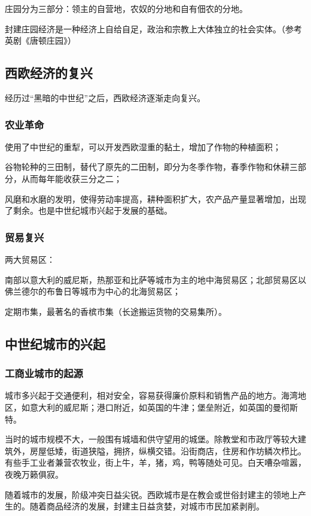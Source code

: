 庄园分为三部分：领主的自营地，农奴的分地和自有佃农的分地。

封建庄园经济是一种经济上自给自足，政治和宗教上大体独立的社会实体。（参考英剧《唐顿庄园》）

\subsection{西欧经济的复兴}
经历过“黑暗的中世纪”之后，西欧经济逐渐走向复兴。

\subsubsection{农业革命}
使用了中世纪的重犁，可以开发西欧湿重的黏土，增加了作物的种植面积；

谷物轮种的三田制，替代了原先的二田制，即分为冬季作物，春季作物和休耕三部分，从而每年能收获三分之二；

风磨和水磨的发明，使得劳动率提高，耕种面积扩大，农产品产量显著增加，出现了剩余。也是中世纪城市兴起于发展的基础。

\subsubsection{贸易复兴}
两大贸易区：

南部以意大利的威尼斯，热那亚和比萨等城市为主的地中海贸易区；北部贸易区以佛兰德尔的布鲁日等城市为中心的北海贸易区；

定期市集，最著名的香槟市集（长途搬运货物的交易集所）。

\subsection{中世纪城市的兴起}

\subsubsection{工商业城市的起源}
城市多兴起于交通便利，相对安全，容易获得廉价原料和销售产品的地方。海湾地区，如意大利的威尼斯；港口附近，如英国的牛津；堡垒附近，如英国的曼彻斯特。

当时的城市规模不大，一般围有城墙和供守望用的城堡。除教堂和市政厅等较大建筑外，房屋低矮，街道狭隘，拥挤，纵横交错。沿街商店，住房和作坊鳞次栉比。有些手工业者兼营农牧业，街上牛，羊，猪，鸡，鸭等随处可见。白天嘈杂喧嚣，夜晚万籁俱寂。

随着城市的发展，阶级冲突日益尖锐。西欧城市是在教会或世俗封建主的领地上产生的。随着商品经济的发展，封建主日益贪婪，对城市市民加紧剥削。

